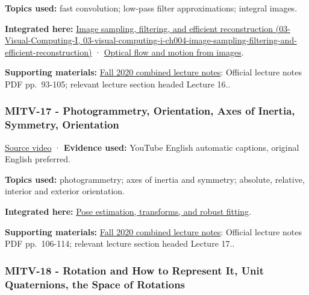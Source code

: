 \textbf{Topics used:} fast convolution; low-pass filter approximations; integral images.

\textbf{Integrated here:} \href{../03-Visual-Computing-I/main.pdf\#nameddest=03-visual-computing-i-ch004-image-sampling-filtering-and-efficient-reconstruction}{Image sampling, filtering, and efficient reconstruction (03-Visual-Computing-I, 03-visual-computing-i-ch004-image-sampling-filtering-and-efficient-reconstruction)} · \hyperref[04-visual-computing-ii-ch030-optical-flow-and-motion-from-images]{Optical flow and motion from images}.

\textbf{Supporting materials:} \href{https://ocw.mit.edu/courses/6-801-machine-vision-fall-2020/9ec44f69e72995c370b3797818ba01e6_MIT6_801F20_lectureNotes.pdf}{Fall 2020 combined lecture notes}: Official lecture notes PDF pp.~93-105; relevant lecture section headed Lecture 16..

\subsubsection{MITV-17 - Photogrammetry, Orientation, Axes of Inertia, Symmetry, Orientation}\label{04-visual-computing-ii-ch036-mitv-17---photogrammetry-orientation-axes-of-inertia-symmetry-orientation}

\href{https://www.youtube.com/watch?v=R8O0vlHBeNc}{Source video} · \textbf{Evidence used:} YouTube English automatic captions, original English preferred.

\textbf{Topics used:} photogrammetry; axes of inertia and symmetry; absolute, relative, interior and exterior orientation.

\textbf{Integrated here:} \hyperref[04-visual-computing-ii-ch032-pose-estimation-transforms-and-robust-fitting]{Pose estimation, transforms, and robust fitting}.

\textbf{Supporting materials:} \href{https://ocw.mit.edu/courses/6-801-machine-vision-fall-2020/9ec44f69e72995c370b3797818ba01e6_MIT6_801F20_lectureNotes.pdf}{Fall 2020 combined lecture notes}: Official lecture notes PDF pp.~106-114; relevant lecture section headed Lecture 17..

\subsubsection{MITV-18 - Rotation and How to Represent It, Unit Quaternions, the Space of Rotations}\label{04-visual-computing-ii-ch036-mitv-18---rotation-and-how-to-represent-it-unit-quaternions-the-space-of-rotations}

